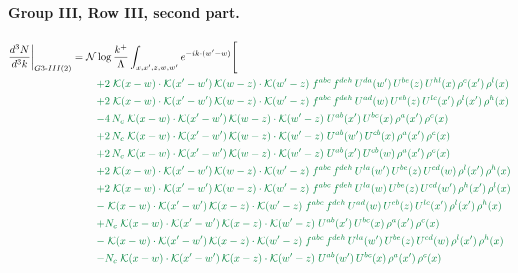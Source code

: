 \documentclass[10pt]{article}
\numberwithin{equation}{section}
\newcommand{\NN}{\mathcal N\log\frac{k^+}{\Lambda}}
\begin{document}
\paragraph{Group III, Row III, second part.}
\begin{align}
\frac{d^3N}{d^3k}\bigg|_{G3\text{-}III(2)}={}&\NN\int_{x,x',z,w,w'}e^{-ik\cdot(w'-w)}\Bigg[\notag\\
&\quad{\color{JIM}+2\;\mathcal{K}(x-w)\cdot\mathcal{K}(x'-w')\,\mathcal{K}(w-z)\cdot\mathcal{K}(w'-z)\;f^{abc}\,f^{deh}\,U^{da}(w')\,U^{be}(z)\,U^{hl}(x)\,\rho^{c}(x')\,\rho^{l}(x)}\notag\\
&\quad{\color{JIM}+2\;\mathcal{K}(x-w)\cdot\mathcal{K}(x'-w')\,\mathcal{K}(w-z)\cdot\mathcal{K}(w'-z)\;f^{abc}\,f^{deh}\,U^{ad}(w)\,U^{eb}(z)\,U^{lc}(x')\,\rho^{l}(x')\,\rho^{h}(x)}\notag\\
&\quad{\color{JIM}-4\,N_c\;\mathcal{K}(x-w)\cdot\mathcal{K}(x'-w')\,\mathcal{K}(w-z)\cdot\mathcal{K}(w'-z)\;U^{ab}(x')\,U^{bc}(x)\,\rho^{a}(x')\,\rho^{c}(x)}\notag\\
&\quad{\color{JIM}+2\,N_c\;\mathcal{K}(x-w)\cdot\mathcal{K}(x'-w')\,\mathcal{K}(w-z)\cdot\mathcal{K}(w'-z)\;U^{ab}(w')\,U^{cb}(x)\,\rho^{a}(x')\,\rho^{c}(x)}\notag\\
&\quad{\color{JIM}+2\,N_c\;\mathcal{K}(x-w)\cdot\mathcal{K}(x'-w')\,\mathcal{K}(w-z)\cdot\mathcal{K}(w'-z)\;U^{ab}(x')\,U^{cb}(w)\,\rho^{a}(x')\,\rho^{c}(x)}\notag\\
&\quad{\color{JIM}+2\;\mathcal{K}(x-w)\cdot\mathcal{K}(x'-w')\,\mathcal{K}(w-z)\cdot\mathcal{K}(w'-z)\;f^{abc}\,f^{deh}\,U^{la}(w')\,U^{be}(z)\,U^{cd}(w)\,\rho^{l}(x')\,\rho^{h}(x)}\notag\\
&\quad{\color{JIM}+2\;\mathcal{K}(x-w)\cdot\mathcal{K}(x'-w')\,\mathcal{K}(w-z)\cdot\mathcal{K}(w'-z)\;f^{abc}\,f^{deh}\,U^{la}(w)\,U^{be}(z)\,U^{cd}(w')\,\rho^{h}(x')\,\rho^{l}(x)}\notag\\
&\quad{\color{JIM}-\;\mathcal{K}(x-w)\cdot\mathcal{K}(x'-w')\,\mathcal{K}(x-z)\cdot\mathcal{K}(w'-z)\;f^{abc}\,f^{deh}\,U^{ad}(w)\,U^{eb}(z)\,U^{lc}(x')\,\rho^{l}(x')\,\rho^{h}(x)}\notag\\
&\quad{\color{JIM}+N_c\;\mathcal{K}(x-w)\cdot\mathcal{K}(x'-w')\,\mathcal{K}(x-z)\cdot\mathcal{K}(w'-z)\;U^{ab}(x')\,U^{bc}(x)\,\rho^{a}(x')\,\rho^{c}(x)}\notag\\
&\quad{\color{JIM}-\;\mathcal{K}(x-w)\cdot\mathcal{K}(x'-w')\,\mathcal{K}(x-z)\cdot\mathcal{K}(w'-z)\;f^{abc}\,f^{deh}\,U^{la}(w')\,U^{be}(z)\,U^{cd}(w)\,\rho^{l}(x')\,\rho^{h}(x)}\notag\\
&\quad{\color{JIM}-N_c\;\mathcal{K}(x-w)\cdot\mathcal{K}(x'-w')\,\mathcal{K}(x-z)\cdot\mathcal{K}(w'-z)\;U^{ab}(w')\,U^{bc}(x)\,\rho^{a}(x')\,\rho^{c}(x)}\notag\\

\end{align}
\end{document}
